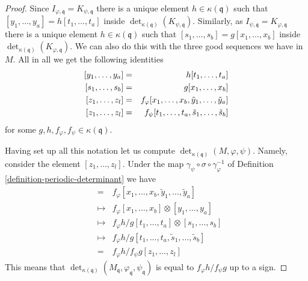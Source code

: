 \begin{proof}
\medskip\noindent
Since $I_{\varphi, \mathfrak q} = K_{\psi, \mathfrak q}$
there is a unique element $h \in \kappa(\mathfrak q)$ such that
$[y_1, \ldots, y_a] = h [t_1, \ldots, t_a]$
inside $\det_{\kappa(\mathfrak q)}(K_{\psi, \mathfrak q})$.
Similarly, as $I_{\psi, \mathfrak q} = K_{\varphi, \mathfrak q}$
there is a unique element $h \in \kappa(\mathfrak q)$ such that
$[s_1, \ldots, s_b] = g [x_1, \ldots, x_b]$
inside $\det_{\kappa(\mathfrak q)}(K_{\varphi, \mathfrak q})$.
We can also do this with the three good sequences we have
in $M$. All in all we get the following identities
\begin{eqnarray*}
\empty [y_1, \ldots, y_a] & = & h [t_1, \ldots, t_a] \\
\empty [s_1, \ldots, s_b] & = & g [x_1, \ldots, x_b] \\
\empty [z_1, \ldots, z_l] & = &
f_\varphi [x_1, \ldots, x_b, \tilde y_1, \ldots, \tilde y_a] \\
\empty [z_1, \ldots, z_l] & = &
f_\psi [t_1, \ldots, t_a, \tilde s_1, \ldots, \tilde s_b]
\end{eqnarray*}
for some $g, h, f_\varphi, f_\psi \in \kappa(\mathfrak q)$.

\medskip\noindent
Having set up all this
notation let us compute $\det_{\kappa(\mathfrak q)}(M, \varphi, \psi)$.
Namely, consider the element $[z_1, \ldots, z_l]$.
Under the map $\gamma_\psi \circ \sigma \circ \gamma_\varphi^{-1}$
of Definition \ref{definition-periodic-determinant} we have
\begin{eqnarray*}
[z_1, \ldots, z_l] & = &
f_\varphi [x_1, \ldots, x_b, \tilde y_1, \ldots, \tilde y_a] \\
& \mapsto & f_\varphi [x_1, \ldots, x_b] \otimes [y_1, \ldots, y_a] \\
& \mapsto &
f_\varphi h/g [t_1, \ldots, t_a] \otimes [s_1, \ldots, s_b] \\
& \mapsto &
f_\varphi h/g [t_1, \ldots, t_a, \tilde s_1, \ldots, \tilde s_b] \\
& = &
f_\varphi h/f_\psi g [z_1, \ldots, z_l]
\end{eqnarray*}
This means that
$\det_{\kappa(\mathfrak q)}
(M_{\mathfrak q}, \varphi_{\mathfrak q}, \psi_{\mathfrak q})$
is equal to $f_\varphi h/f_\psi g$ up to a sign.


\end{proof}
